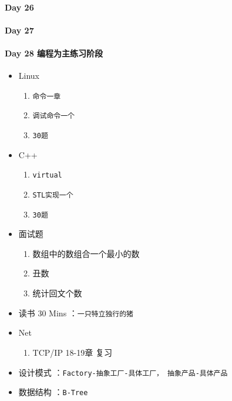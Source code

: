 \documentclass[UTF8,a4paper,8pt]{ctexart}
\begin{document}
 	 \paragraph{Day 26      \quad     }
 	 \paragraph{Day 27      \quad     }
 	 \paragraph{Day 28  编程为主练习阶段    \quad     }
	 	 \begin{itemize}[itemindent = 1em]
	 	 	\renewcommand\labelitemi{\makebox[0pt][l]{$\square$}\hspace{1em}} 
	 	 	\renewcommand\labelitemi{\makebox[0pt][l]{$\square$}\raisebox{.15ex}{\hspace{0.1em}$\checkmark$}}	 	
	 	 	\item   Linux 
	 	 	\begin{enumerate}
	 	 		\item \verb|命令一章|
	 	 		\item \verb|调试命令一个|
	 	 		\item \verb|30题|
	 	 	\end{enumerate}
	 	 	\item   C++   
	 	 	\begin{enumerate}
	 	 		\item \verb|virtual|
	 	 		\item \verb|STL实现一个|
	 	 		\item \verb|30题|
	 	 	\end{enumerate}
	 	 	
	 	 	\item  面试题
	 	 	\begin{enumerate}
	 	 		\item 数组中的数组合一个最小的数
	 	 		\item 丑数
	 	 		\item 统计回文个数
	 	 	\end{enumerate}
	 	 	
	 	 	\item   读书  30 Mins	：\verb|一只特立独行的猪|
	 	 	\item   Net
	 	 	\begin{enumerate}
	 	 		\item TCP/IP  18-19章 复习
	 	 	\end{enumerate}	
	 	 	
	 	 	\renewcommand\labelitemi{\makebox[0pt][l]{$\square$}\hspace{1em}}
	 	 	\item   设计模式 ：\verb|Factory-抽象工厂-具体工厂， 抽象产品-具体产品| 
	 	 	\item   数据结构 ：\verb|B-Tree| 
	 	 \end{itemize}
\end{document}
